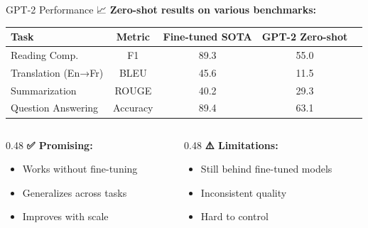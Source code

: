 \documentclass[aspectratio=169]{beamer}
\begin{document}
\begin{frame}[shrink=10]{GPT-2 Performance 📈}
    \textbf{Zero-shot results on various benchmarks:}

    \vspace{0.3cm}

    \begin{table}
        \small
        \begin{tabular}{lcccc}
            \toprule
            \textbf{Task} & \textbf{Metric} & \textbf{Fine-tuned SOTA} & \textbf{GPT-2 Zero-shot} \\
            \midrule
            Reading Comp. & F1 & 89.3 & 55.0 \\
            Translation (En→Fr) & BLEU & 45.6 & 11.5 \\
            Summarization & ROUGE & 40.2 & 29.3 \\
            Question Answering & Accuracy & 89.4 & 63.1 \\
            \bottomrule
        \end{tabular}
    \end{table}

    \vspace{0.3cm}

    \begin{columns}[T]
        \begin{column}{0.48\textwidth}
            \textbf{✅ Promising:}
            \begin{itemize}\setlength{\itemsep}{0pt}
                \item Works without fine-tuning
                \item Generalizes across tasks
                \item Improves with scale
            \end{itemize}
        \end{column}

        \begin{column}{0.48\textwidth}
            \textbf{⚠️ Limitations:}
            \begin{itemize}\setlength{\itemsep}{0pt}
                \item Still behind fine-tuned models
                \item Inconsistent quality
                \item Hard to control
            \end{itemize}
        \end{column}
    \end{columns}
\end{frame}
\end{document}
